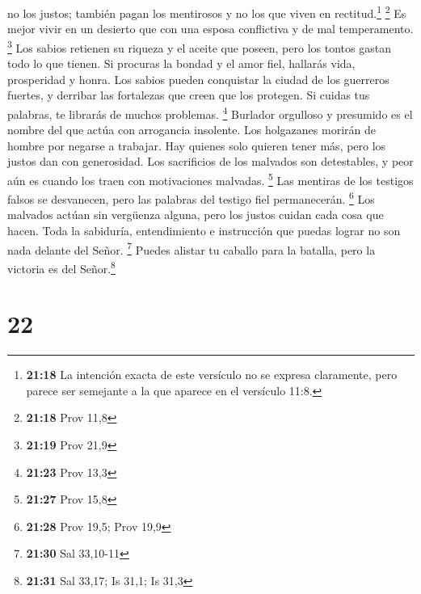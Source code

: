 no los justos; también pagan los mentirosos y no los que viven en
rectitud.\footnote{\textbf{21:18} La intención exacta de este versículo
  no se expresa claramente, pero parece ser semejante a la que aparece
  en el versículo 11:8.} \footnote{\textbf{21:18} Prov 11,8}
 Es mejor vivir en un desierto que con una esposa
conflictiva y de mal temperamento. \footnote{\textbf{21:19} Prov 21,9}
 Los sabios retienen su riqueza y el aceite que poseen,
pero los tontos gastan todo lo que tienen.  Si procuras
la bondad y el amor fiel, hallarás vida, prosperidad y honra.
 Los sabios pueden conquistar la ciudad de los guerreros
fuertes, y derribar las fortalezas que creen que los protegen.
 Si cuidas tus palabras, te librarás de muchos problemas.
\footnote{\textbf{21:23} Prov 13,3}  Burlador orgulloso y
presumido es el nombre del que actúa con arrogancia insolente.
 Los holgazanes morirán de hombre por negarse a trabajar.
 Hay quienes solo quieren tener más, pero los justos dan
con generosidad.  Los sacrificios de los malvados son
detestables, y peor aún es cuando los traen con motivaciones malvadas.
\footnote{\textbf{21:27} Prov 15,8}  Las mentiras de los
testigos falsos se desvanecen, pero las palabras del testigo fiel
permanecerán. \footnote{\textbf{21:28} Prov 19,5; Prov 19,9}
 Los malvados actúan sin vergüenza alguna, pero los
justos cuidan cada cosa que hacen.  Toda la sabiduría,
entendimiento e instrucción que puedas lograr no son nada delante del
Señor. \footnote{\textbf{21:30} Sal 33,10-11}  Puedes
alistar tu caballo para la batalla, pero la victoria es del
Señor.\footnote{\textbf{21:31} Sal 33,17; Is 31,1; Is 31,3}

\hypertarget{section-21}{%
\section{22}\label{section-21}}

